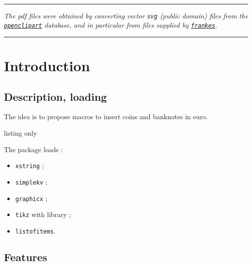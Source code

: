 \documentclass[11pt,a4paper]{ltxdoc}
\begin{document}
\vfill~

\hrule

\medskip

\emph{%
	The pdf files were obtained by converting vector \texttt{svg} (public domain) files from the \href{https://openclipart.org/artist/frankes?p=3}{\texttt{openclipart}} database, and in particular from files supplied by \href{https://openclipart.org/artist/frankes?p=3}{\texttt{frankes}}.
}

\medskip

\hrule

\vspace*{5mm}

\pagebreak


\hypertarget{matoc}{}

\tableofcontents

\vspace*{5mm}


\pagebreak

\section{Introduction}

\subsection{Description, loading}

The idea is to propose macros to insert coins and banknotes in euro.

\begin{DemoCode}{listing only}
\usepackage{euromoney}
\end{DemoCode}

The  package loads :

\begin{itemize}
	\item \lstinline{xstring} ;
	\item \lstinline{simplekv} ;
	\item \lstinline{graphicx} ;
	\item \lstinline{tikz} with  library ;
	\item \lstinline{listofitems}.
\end{itemize}

\subsection{Features}
\end{document}
